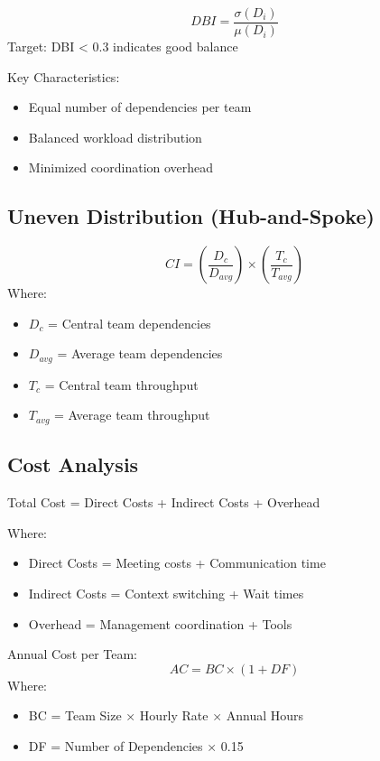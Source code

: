 \documentclass[12pt,a4paper]{article}
\newenvironment{definition}[1]
{\begin{mdframed}[style=definitionstyle,frametitle={Definition: #1}]}
{\end{mdframed}}
\newenvironment{explanation}
{\begin{mdframed}[style=explanationstyle,frametitle={Explanation}]}
{\end{mdframed}}
\begin{document}
\begin{definition}{Dependency Balance Index}
\[
DBI = \frac{\sigma(D_i)}{\mu(D_i)}
\]
Target: DBI < 0.3 indicates good balance
\end{definition}

\begin{explanation}
Key Characteristics:
\begin{itemize}
    \item Equal number of dependencies per team
    \item Balanced workload distribution
    \item Minimized coordination overhead
\end{itemize}
\end{explanation}

\subsection{Uneven Distribution (Hub-and-Spoke)}

\begin{definition}{Centrality Impact}
\[
CI = \left(\frac{D_c}{D_{avg}}\right) \times \left(\frac{T_c}{T_{avg}}\right)
\]
Where:
\begin{itemize}
    \item $D_c$ = Central team dependencies
    \item $D_{avg}$ = Average team dependencies
    \item $T_c$ = Central team throughput
    \item $T_{avg}$ = Average team throughput
\end{itemize}
\end{definition}

\subsection{Cost Analysis}

\begin{definition}{Cost Structure}
Total Cost = Direct Costs + Indirect Costs + Overhead

Where:
\begin{itemize}
    \item Direct Costs = Meeting costs + Communication time
    \item Indirect Costs = Context switching + Wait times
    \item Overhead = Management coordination + Tools
\end{itemize}

Annual Cost per Team:
\[
AC = BC \times (1 + DF)
\]
Where:
\begin{itemize}
    \item BC = Team Size × Hourly Rate × Annual Hours
    \item DF = Number of Dependencies × 0.15
\end{itemize}
\end{definition}
\end{document}
